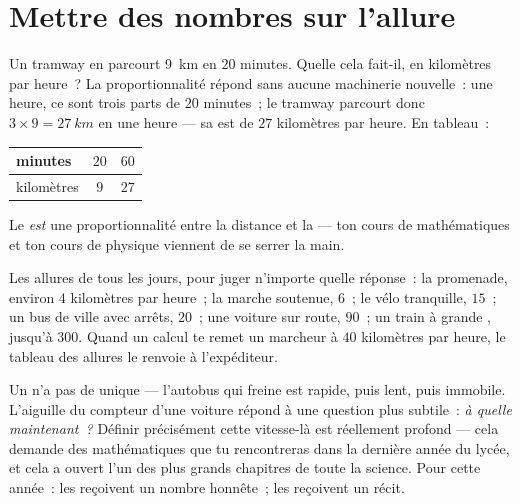\section{Mettre des nombres sur l'allure}

\begin{example}\label{ex:g6:describing-motion:proportion}
Un tramway en  parcourt \qty{9}{km} en $20$
minutes. Quelle  cela fait-il, en kilomètres par heure~? La
proportionnalité répond sans aucune machinerie nouvelle~: une heure,
ce sont trois parts de $20$ minutes~; le tramway parcourt donc
$3 \times 9 = \qty{27}{km}$ en une heure --- sa  est de $27$
kilomètres par heure. En tableau~:
\begin{center}
\begin{tabular}{l|cc}
minutes & $20$ & $60$ \\
\hline
kilomètres & $9$ & $27$
\end{tabular}
\end{center}
Le  \emph{est} une proportionnalité entre la
distance et la  --- ton cours de mathématiques et ton cours de
physique viennent de se serrer la main.
\end{example}

\begin{example}\label{ex:g6:describing-motion:paces}
Les allures de tous les jours, pour juger n'importe quelle réponse~:
la promenade, environ $4$ kilomètres par heure~; la marche
soutenue, $6$~; le vélo tranquille, $15$~; un bus de ville avec
arrêts, $20$~; une voiture sur route, $90$~; un train à grande
, jusqu'à $300$. Quand un calcul te remet un marcheur à $40$
kilomètres par heure, le tableau des allures le renvoie à
l'expéditeur.
\end{example}

\begin{remark}\label{rem:g6:describing-motion:instant}
Un  n'a pas de  unique --- l'autobus qui freine
est rapide, puis lent, puis immobile. L'aiguille du compteur d'une
voiture répond à une question plus subtile~: \emph{à quelle 
maintenant~?} Définir précisément cette vitesse-là est réellement
profond --- cela demande des mathématiques que tu rencontreras dans
la dernière année du lycée, et cela a ouvert l'un des plus grands
chapitres de toute la science. Pour cette année~: les  reçoivent un nombre honnête~; les 
reçoivent un récit.
\end{remark}

